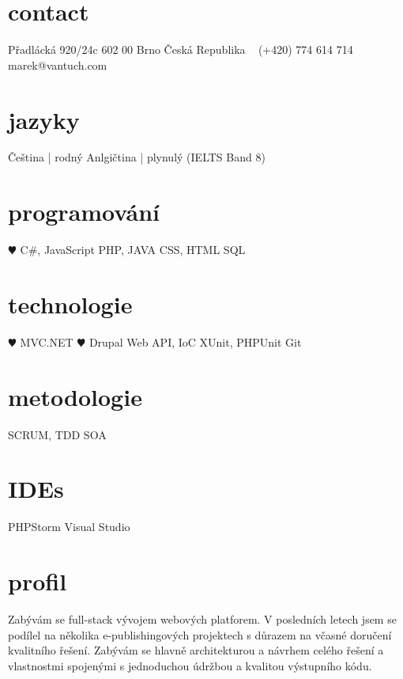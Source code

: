 \documentclass[]{friggeri-cv} %
\begin{document}


\begin{aside} %
\section{contact}
Přadlácká 920/24c
602 00 Brno
Česká Republika
~
(+420) 774 614 714
~
marek@vantuch.com
\section{jazyky}
Čeština | rodný
Anlgičtina | plynulý
(IELTS Band 8)
\section{programování}
{\color{red} $\varheartsuit$} C\#, JavaScript
PHP, JAVA
CSS, HTML
SQL
\section{technologie}
{\color{red} $\varheartsuit$} MVC.NET {\color{red} $\varheartsuit$} Drupal
Web API, IoC
XUnit, PHPUnit
Git
\section{metodologie}
SCRUM, TDD
SOA
\section{IDEs}
PHPStorm
Visual Studio
\end{aside}

\section{profil}
Zabývám se full-stack vývojem webových platforem.
V posledních letech jsem se podílel na několika e-publishingových projektech s důrazem na včasné doručení kvalitního řešení.
Zabývám se hlavně architekturou a návrhem celého řešení a vlastnostmi spojenými s jednoduchou údržbou a kvalitou výstupního kódu.
\end{document}
